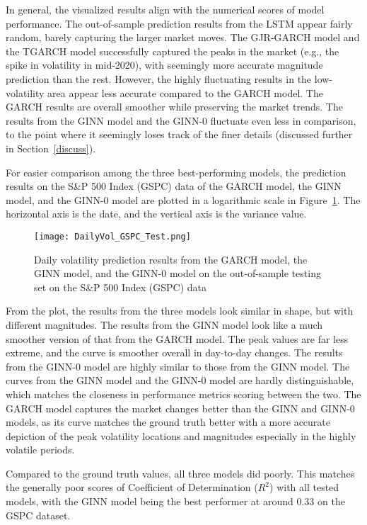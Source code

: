 In general, the visualized results align with the numerical scores of model performance. The out-of-sample prediction results from the LSTM appear fairly random, barely capturing the larger market moves. The GJR-GARCH model and the TGARCH model successfully captured the peaks in the market (e.g., the spike in volatility in mid-2020), with seemingly more accurate magnitude prediction than the rest. However, the highly fluctuating results in the low-volatility area appear less accurate compared to the GARCH model. The GARCH results are overall smoother while preserving the market trends. The results from the GINN model and the GINN-0 fluctuate even less in comparison, to the point where it seemingly loses track of the finer details (discussed further in Section~\ref{discuss}). 

For easier comparison among the three best-performing models, the prediction results on the S\&P 500 Index (GSPC) data of the GARCH model, the GINN model, and the GINN-0 model are plotted in a logarithmic scale in Figure~\ref{threebest}. The horizontal axis is the date, and the vertical axis is the variance value. 

\begin{figure}[h]
  \centering
  \texttt{[image: DailyVol\_GSPC\_Test.png]}
  \caption{Daily volatility prediction results from the GARCH model, the GINN model, and the GINN-0 model on the out-of-sample testing set on the S\&P 500 Index (GSPC) data}
  \label{threebest}
\end{figure}

From the plot, the results from the three models look similar in shape, but with different magnitudes. The results from the GINN model look like a much smoother version of that from the GARCH model. The peak values are far less extreme, and the curve is smoother overall in day-to-day changes. The results from the GINN-0 model are highly similar to those from the GINN model. The curves from the GINN model and the GINN-0 model are hardly distinguishable, which matches the closeness in performance metrics scoring between the two. The GARCH model captures the market changes better than the GINN and GINN-0 models, as its curve matches the ground truth better with a more accurate depiction of the peak volatility locations and magnitudes especially in the highly volatile periods. 

Compared to the ground truth values, all three models did poorly. This matches the generally poor scores of Coefficient of Determination ($R^2$) with all tested models, with the GINN model being the best performer at around 0.33 on the GSPC dataset. 

